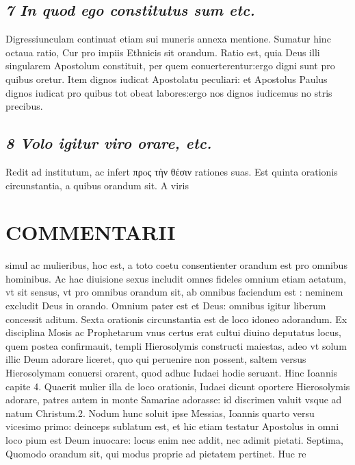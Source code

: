 \documentclass{article}
\begin{document}
\begin{pages}
\subsection*{\textit{7 In quod ego constitutus sum etc. }}\pstart Digressiunculam continuat etiam sui muneris annexa mentione. Sumatur hinc octaua ratio, Cur pro impiis Ethnicis sit orandum. Ratio est, quia Deus illi singularem Apostolum constituit, per quem conuerterentur:ergo digni sunt pro quibus oretur. Item dignos iudicat Apostolatu peculiari: et Apostolus Paulus dignos iudicat pro quibus tot obeat labores:ergo nos dignos iudicemus no stris precibus.  \pend
{}
{}
\subsection*{\textit{8 Volo igitur viro orare, etc. }}\pstart Redit ad institutum, ac infert πρoς τὴν θέσιν rationes suas. Est quinta orationis circunstantia, a quibus orandum sit. A viris  \pend
\section*{COMMENTARII }
\marginpar{[ p.52 ]}\pstart simul ac mulieribus, hoc est, a toto coetu consentienter orandum est pro omnibus hominibus. Ac hac diuisione sexus includit omnes fideles omnium etiam aetatum, vt sit sensus, vt pro omnibus orandum sit, ab omnibus faciendum est : neminem excludit Deus in orando. Omnium pater est et Deus: omnibus igitur liberum concessit aditum.  \pend\pstart Sexta orationis circunstantia est de loco idoneo adorandum. Ex disciplina Mosis ac Prophetarum vnus certus erat cultui diuino deputatus locus, quem postea confirmauit, templi Hierosolymis constructi maiestas, adeo vt solum illic Deum adorare liceret, quo qui peruenire non possent, saltem versus Hierosolymam conuersi orarent, quod adhuc Iudaei hodie seruant. Hinc Ioannis capite 4. Quaerit mulier illa de loco orationis, Iudaei dicunt oportere Hierosolymis adorare, patres autem in monte Samariae adorasse: id discrimen valuit vsque ad natum Christum.2. Nodum hunc soluit ipse Messias, Ioannis quarto versu vicesimo primo: deinceps sublatum est, et hic etiam testatur Apostolus in omni loco pium est Deum inuocare: locus enim nec addit, nec adimit pietati.  \pend\pstart Septima, Quomodo orandum sit, qui modus proprie ad pietatem pertinet. Huc re\pend

\end{pages}
\end{document}
